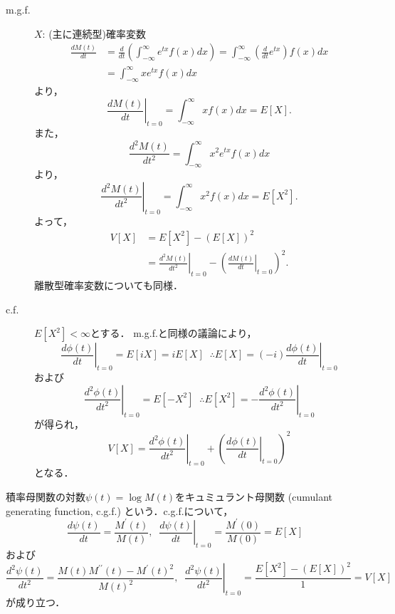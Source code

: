 \documentclass{jsreport}
\begin{document}
\begin{description}
  \item[m.g.f.]
  $X$: (主に連続型)確率変数
  \begin{align}
    \frac{d M(t)}{dt} &= \frac{d}{dt} \left( \int_{-\infty}^{\infty} e^{tx} f(x) dx\right)
    = \int_{-\infty}^{\infty} \left(\frac{d}{dt} e^{tx}\right) f(x) dx \nonumber \\
    &= \int_{-\infty}^{\infty} x e^{tx} f(x) dx \nonumber
  \end{align}
  より，
  \begin{equation}
    \left.\frac{d M(t)}{dt}\right|_{t = 0} = \int_{-\infty}^{\infty} xf(x) dx = E[X]. \nonumber
  \end{equation}
  また，
  \begin{equation}
    \frac{d^2 M(t)}{dt^2} = \int_{-\infty}^{\infty} x^2 e^{tx} f(x) dx \nonumber
  \end{equation}
  より，
  \begin{equation}
    \left.\frac{d^2 M(t)}{dt^2}\right|_{t = 0} = \int_{-\infty}^{\infty} x^2 f(x) dx = E[X^2]. \nonumber
  \end{equation}
  よって，
  \begin{align}
    V[X] &= E[X^2] - (E[X])^2 \nonumber  \\
    &= \left.\frac{d^2 M(t)}{dt^2}\right|_{t = 0} - \left(\left.\frac{d M(t)}{dt}\right|_{t = 0}\right)^2. \nonumber
  \end{align}
  離散型確率変数についても同様．
  \item[c.f.]
  $E[X^2] < \infty$とする．
  m.g.f.と同様の議論により，
  \begin{equation}
    \left.\frac{d \phi(t)}{dt}\right|_{t = 0} = E[iX] = i E[X] \; \; \therefore E[X] = (-i) \left.\frac{d \phi(t)}{dt}\right|_{t = 0} \nonumber
  \end{equation}
  および
  \begin{equation}
    \left.\frac{d^2 \phi(t)}{dt^2}\right|_{t = 0} = E[-X^2] \; \; \therefore E[X^2] = - \left.\frac{d^2 \phi(t)}{dt^2}\right|_{t = 0} \nonumber
  \end{equation}
  が得られ，
  \begin{equation}
    V[X] = \left.\frac{d^2 \phi(t)}{dt^2}\right|_{t = 0} + \left(\left.\frac{d \phi(t)}{dt}\right|_{t = 0}\right)^2 \nonumber
  \end{equation}
  となる．
\end{description}

積率母関数の対数$\psi(t) = \log M(t)$をキュミュラント母関数 (cumulant generating function, c.g.f.) という．c.g.f.について，
\begin{equation}
  \frac{d \psi(t)}{dt} = \frac{M^{\prime}(t)}{M(t)}, \; \; \left.\frac{d \psi(t)}{dt}\right|_{t = 0} = \frac{M^{\prime}(0)}{M(0)}  = E[X] \nonumber
\end{equation}
および
\begin{equation}
  \frac{d^2 \psi(t)}{dt^2} = \frac{M(t) M^{\prime \prime}(t) - M^{\prime}(t)^2}{M(t)^2}, \; \; \left.\frac{d^2 \psi(t)}{dt^2}\right|_{t = 0} = \frac{E[X^2] - (E[X])^2}{1} = V[X] \nonumber
\end{equation}
が成り立つ．
\end{document}
